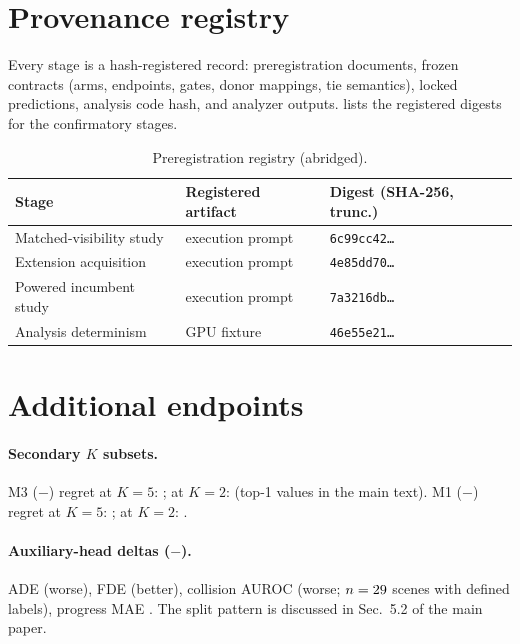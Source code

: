 \documentclass[10pt,twocolumn,letterpaper]{article}
\begin{document}
\section{Provenance registry}
\label{supp:registry}

Every stage is a hash-registered record: preregistration documents, frozen contracts (arms, endpoints, gates, donor mappings, tie semantics), locked predictions, analysis code hash, and analyzer outputs.
 lists the registered digests for the confirmatory stages.

\begin{table}[h]
  \centering
  \small
  \begin{tabular}{@{}lll@{}}
    \toprule
    Stage & Registered artifact & Digest (SHA-256, trunc.) \\
    \midrule
    Matched-visibility study & execution prompt & \texttt{6c99cc42\ldots} \\
    Extension acquisition & execution prompt & \texttt{4e85dd70\ldots} \\
    Powered incumbent study & execution prompt & \texttt{7a3216db\ldots} \\
    Analysis determinism & GPU fixture & \texttt{46e55e21\ldots} \\
    \bottomrule
  \end{tabular}
  \caption{Preregistration registry (abridged). }
  \label{tab:registry}
\end{table}

\section{Additional endpoints}
\label{supp:endpoints}

\paragraph{Secondary $K$ subsets.}
M3 (\Ltok$-$\Lnull) regret at $K{=}5$: \MThreeKFiveRegretCI; at $K{=}2$: \MThreeKTwoRegretCI{} (top-1 values in the main text).
M1 (\Lfull$-$\Ltok) regret at $K{=}5$: \MOneKFiveRegretCI; at $K{=}2$: \MOneKTwoRegretCI.

\paragraph{Auxiliary-head deltas (\Lfull$-$\Ltok).}
ADE \AuxAdeCI{} (worse), FDE \AuxFdeCI{} (better), collision AUROC \AuxCollisionCI{} (worse; $n=29$ scenes with defined labels), progress MAE \AuxProgressCI.
The split pattern is discussed in Sec.~5.2 of the main paper.
\end{document}
